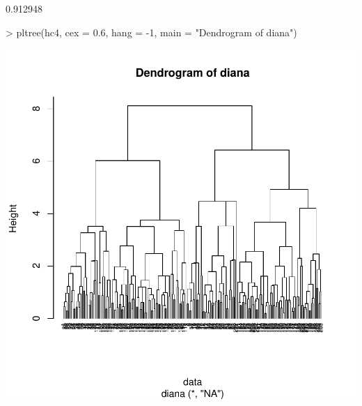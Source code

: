 \documentclass [a4paper] {article}
\begin{document}
\begin{Schunk}
\begin{Soutput}
[1] 0.912948
\end{Soutput}
\begin{Sinput}
> pltree(hc4, cex = 0.6, hang = -1, main = "Dendrogram of diana")
\end{Sinput}
\end{Schunk}
\includegraphics{entrega-jerarquico_3}
\end{document}
